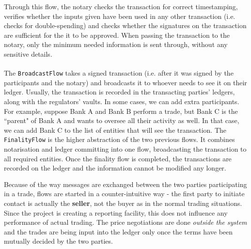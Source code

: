\documentclass[12pt,twoside]{article}
\begin{document}
Through this flow, the notary checks the transaction for correct timestamping, verifies whether the inputs given have been used in any other transaction (i.e. checks for double-spending) and checks whether the signatures on the transaction are sufficient for the it to be approved. When passing the transaction to the notary, only the minimum needed information is sent through, without any sensitive details.
\\ \\
The \verb|BroadcastFlow| takes a signed transaction (i.e. after it was signed by the participants and the notary) and broadcasts it to whoever needs to see it on their ledger. Usually, the transaction is recorded in the transacting parties' ledgers, along with the regulators' vaults. In some cases, we can add extra participants. For example, suppose Bank A and Bank B perform a trade, but Bank C is the ``parent" of Bank A and wants to oversee all their activity as well. In that case, we can add Bank C to the list of entities that will see the transaction. The \verb|FinalityFlow| is the higher abstraction of the two previous flows. It combines notarisation and ledger committing into one flow, broadcasting the transaction to all required entities. Once the finality flow is completed, the transactions are recorded on the ledger and the information cannot be modified any longer.

Because of the way messages are exchanged between the two parties participating in a trade, flows are started in a counter-intuitive way - the first party to initiate contact is actually the \textbf{seller}, not the buyer as in the normal trading situations. Since the project is creating a reporting facility, this does not influence any performance of actual trading. The price negotiations are done \textit{outside the system} and the trades are being input into the ledger only once the terms have been mutually decided by the two parties.
\end{document}
